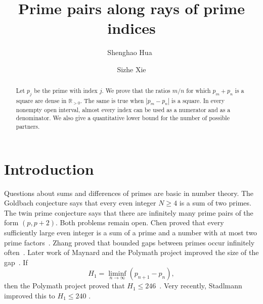 \documentclass[12pt,reqno]{amsart}
\numberwithin{equation}{section}
\theoremstyle{plain}
\theoremstyle{remark}
\begin{document}
\title{Prime pairs along rays of prime indices}

\author{Shenghao Hua~}
\address{Shanghai Institute for Mathematics and Interdisciplinary Sciences (SIMIS), Shanghai 200433, China}
\address{Research Institute of Intelligent Complex Systems, Fudan University, Shanghai, 200433, China}

\author{Sizhe Xie}
\address{Morningside Center of Mathematics, Academy of Mathematics and Systems Science, Chinese Academy of Sciences, Beijing 100190, China}



\begin{abstract}
Let $p_j$ be the prime with index $j$.  We prove that the ratios $m/n$ for which $p_m+p_n$ is a square are dense in $\mathbb R_{>0}$.
The same is true when $|p_m-p_n|$ is a square.  In every nonempty open interval, almost every index can be used as a numerator and as a denominator.
We also give a quantitative lower bound for the number of possible partners.
\end{abstract}



\maketitle

\section{Introduction}

Questions about sums and differences of primes are basic in number theory.
The Goldbach conjecture says that every even integer $N\geq4$ is a sum of two primes.
The twin prime conjecture says that there are infinitely many prime pairs of the form $(p,p+2)$.  Both problems remain open.
Chen proved that every sufficiently large even integer is a sum of a prime and a number with at most two prime factors~\cite{Chen1966,Chen1973}.
Zhang proved that bounded gaps between primes occur infinitely often~\cite{Zhang2014}.
Later work of Maynard and the Polymath project improved the size of the gap~\cite{Maynard2015,Polymath2014,PolymathSieve2014}.  If
\begin{equation*}
 H_1=\liminf_{n\to\infty}(p_{n+1}-p_n),
\end{equation*}
then the Polymath project proved that $H_1\leq246$~\cite[Theorem~4(i)]{PolymathSieve2014}.
Very recently, Stadlmann improved this
to $H_1\leq240$ \cite{Stadlmann2026}.
\end{document}
